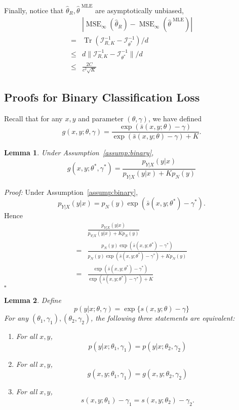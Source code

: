 \documentclass[11pt,a4paper]{article}
\newcommand{\qed}{\square}
\newcommand{\mse}{\operatorname{MSE}}
\newcommand{\tr}{\operatorname{Tr}}
\newcommand{\wh}[1]{\widehat{#1}}
\newcommand{\mle}{\wh{\theta}^{\text{~MLE}}}
\newcommand{\str}[3]{s(#1, #2; #3)}
\newcommand{\ssf}[3]{\bar{s}(#1, #2; #3)}
\newcommand{\fisher}{\mathcal{I}_{\theta^*}}
\newtheorem{lemma}{Lemma}[section]
\begin{document}
Finally, notice that $\wh{\theta}_R, \mle$ are asymptotically unbiased, 
\begin{equation*}
\begin{aligned}
  & | \mse_{\infty} (\wh{\theta}_R) -  \mse_{\infty} (\mle)|  \\
= & \tr(\mathcal{I}_{R, K}^{-1} - \fisher^{-1})/d  \\
\leq &  d \|\mathcal{I}_{R, K}^{-1} - \fisher^{-1}\|/d \\
\leq & \frac{2C}{c^2\sqrt{K}}
\end{aligned}
\end{equation*}



\subsection{Proofs for Binary Classification Loss}
\label{sec:proof-binary}


Recall that for any $x, y$ and parameter $(\theta, \gamma)$, we have defined 
\[
g(x, y; \theta, \gamma) = \frac{\exp(\ssf{x}{y}{\theta} - \gamma)}{\exp(\ssf{x}{y}{\theta} - \gamma) + K}.
\]

\begin{lemma}
Under Assumption~\ref{assump:binary}, 
\[
g(x, y; \theta^*, \gamma^*) 
= \frac{p_{Y|X}(y|x)}{p_{Y|X}(y|x) + K p_N(y)}
\]
\label{lemma:g}
\end{lemma}

{\em Proof:} Under Assumption~\ref{assump:binary}, 
\[
p_{Y|X}(y | x) = p_N(y) \exp(\ssf{x}{y}{\theta^*} - \gamma^*).
\]
Hence
\begin{equation*}
\begin{aligned}
&\frac{p_{Y|X}(y|x)}{p_{Y|X}(y|x) + Kp_N(y)}\\ 
= & \frac{p_N(y) \exp(\ssf{x}{y}{\theta^*} - \gamma^*)}{p_N(y) \exp(\ssf{x}{y}{\theta^*} - \gamma^*) + Kp_N(y)} \\
= &\frac{\exp(\ssf{x}{y}{\theta^*} - \gamma^*)}{\exp(\ssf{x}{y}{\theta^*} - \gamma^*) + K} 
\end{aligned}
\end{equation*}
$\qed$

\begin{lemma}
Define 
\[
p(y | x; \theta, \gamma) = \exp \{ \str{x}{y}{\theta} - \gamma \}
\]
For any $(\theta_1, \gamma_1), (\theta_2, \gamma_2)$, the following three statements are equivalent: 
\begin{enumerate}[label={(\arabic*)}]
  \item  For all $x, y$,
  \[
  p(y | x; \theta_1, \gamma_1) = p(y | x; \theta_2, \gamma_2)
  \]
  \item  For all $x, y$,
  \[
  g(x, y ; \theta_1, \gamma_1) = g(x, y ; \theta_2, \gamma_2)
  \]
  \item  For all $x, y$,
  \[
  \str{x}{y}{\theta_1} - \gamma_1 = \str{x}{y}{\theta_2} - \gamma_2.
  \]
\end{enumerate}
\label{lem:iden-binary}
\end{lemma}
\end{document}
